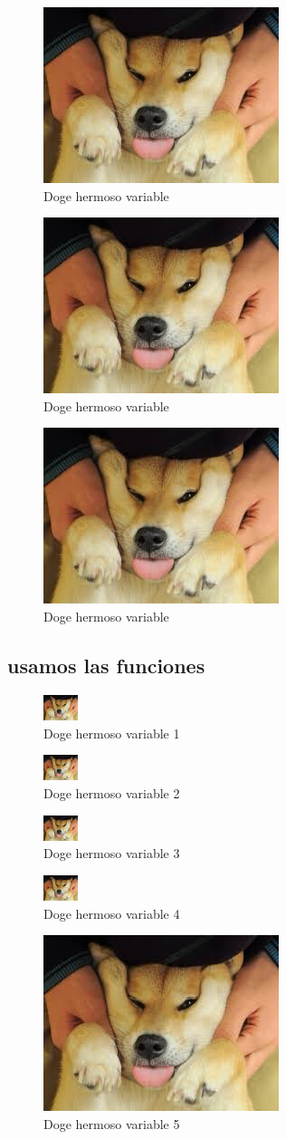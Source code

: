\documentclass[]{article}
\newcommand{\insertadoge}[2]{
	\begin{figure}[H]
		\centering
		\includegraphics[width=#1]{doge.jpg}
		\caption{Doge hermoso variable #2}
	\end{figure}
}
\begin{document}
\begin{figure}[H]
	\centering
	\includegraphics[width=\dogesize]{doge.jpg}
	\caption{Doge hermoso variable}
\end{figure}

\begin{figure}[H]
	\centering
	\includegraphics[width=\dogesize]{doge.jpg}
	\caption{Doge hermoso variable}
\end{figure}

\begin{figure}[H]
	\centering
	\includegraphics[width=\dogesize]{doge.jpg}
	\caption{Doge hermoso variable}
\end{figure}

\subsection{usamos las funciones}

\def\dogechico {1cm}
\insertadoge{\dogechico}{1}
\insertadoge{\dogechico}{2}
\insertadoge{\dogechico}{3}
\insertadoge{\dogechico}{4}
\insertadoge{\dogesize}{5}
\end{document}
